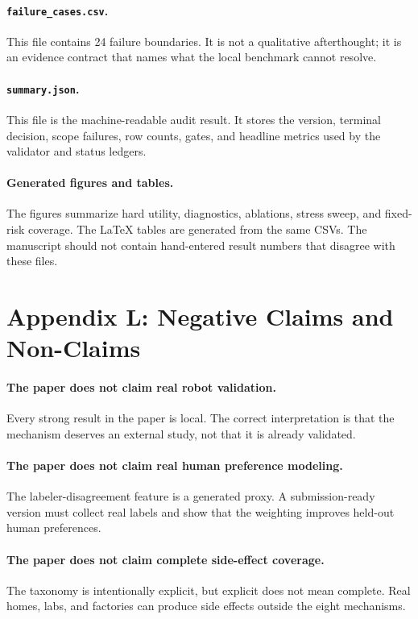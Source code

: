 \documentclass{article}
\begin{document}
\paragraph{\texttt{failure\_cases.csv}.}
This file contains 24 failure boundaries. It is not a qualitative afterthought; it is an evidence contract that names what the local benchmark cannot resolve.

\paragraph{\texttt{summary.json}.}
This file is the machine-readable audit result. It stores the version, terminal decision, scope failures, row counts, gates, and headline metrics used by the validator and status ledgers.

\paragraph{Generated figures and tables.}
The figures summarize hard utility, diagnostics, ablations, stress sweep, and fixed-risk coverage. The LaTeX tables are generated from the same CSVs. The manuscript should not contain hand-entered result numbers that disagree with these files.

\clearpage
\section*{Appendix L: Negative Claims and Non-Claims}
\paragraph{The paper does not claim real robot validation.}
Every strong result in the paper is local. The correct interpretation is that the mechanism deserves an external study, not that it is already validated.

\paragraph{The paper does not claim real human preference modeling.}
The labeler-disagreement feature is a generated proxy. A submission-ready version must collect real labels and show that the weighting improves held-out human preferences.

\paragraph{The paper does not claim complete side-effect coverage.}
The taxonomy is intentionally explicit, but explicit does not mean complete. Real homes, labs, and factories can produce side effects outside the eight mechanisms.
\end{document}
